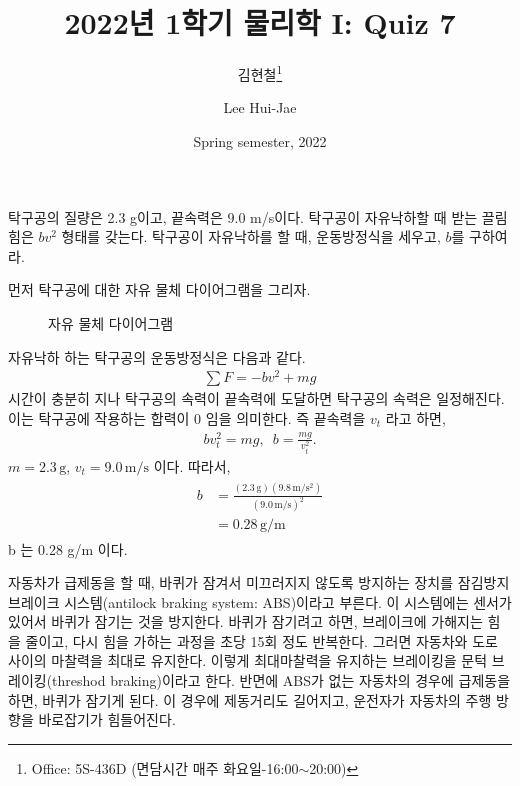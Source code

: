 \documentclass[floatfix,nofootinbib,superscriptaddress,fleqn]{revtex4-2}
\begin{document}
\title{\Large 2022년 1학기 물리학 I: Quiz 7}
\author{김현철\footnote{Office: 5S-436D (면담시간 매주
    화요일-16:00$\sim$20:00)}} 
\author{Lee Hui-Jae} 
\date{Spring semester, 2022}


\vspace{1.cm}
\maketitle

탁구공의 질량은 2.3 g이고, 끝속력은 $9.0$ m/s이다. 탁구공이 자유낙하할
때 받는 끌림힘은 $bv^2$ 형태를 갖는다. 탁구공이 자유낙하를 할 때,
운동방정식을 세우고, $b$를 구하여라.  

 먼저 탁구공에 대한 자유 물체 다이어그램을 그리자.
\begin{figure}[htp]
  \centering
  \caption{자유 물체 다이어그램}
  \label{fig:1}
\end{figure}

자유낙하 하는 탁구공의 운동방정식은 다음과 같다.
\begin{align}
  \sum F = -bv^2+mg
\end{align}
시간이 충분히 지나 탁구공의 속력이 끝속력에 도달하면 탁구공의 속력은 
일정해진다. 이는 탁구공에 작용하는 합력이 0 임을 의미한다. 즉 끝속력을
$v_t$ 라고 하면,
\begin{align}
  bv_t^2 = mg,\,\,\, b =\frac{mg}{v_t^2}.
\end{align}
$m = 2.3\,\mathrm{g}$, $v_t = 9.0\,\mathrm{m/s}$ 이다. 따라서,
\begin{align}
  \begin{split}
    b &= \frac{(2.3\,\mathrm{g})(9.8\,\mathrm{m/s^2})}{( 9.0\,\mathrm{m/s})^2}  \\
    &= 0.28\,\mathrm{g/m}
  \end{split}
  \end{align}
  b 는 0.28 g/m 이다.
\vspace{1.cm}

 자동차가 급제동을 할 때, 바퀴가
잠겨서 미끄러지지 않도록 방지하는 장치를 잠김방지 브레이크
시스템(antilock braking system: ABS)이라고 부른다. 이 시스템에는
센서가 있어서 바퀴가 잠기는 것을 방지한다. 바퀴가 잠기려고 하면,
브레이크에 가해지는 힘을 줄이고, 다시 힘을 가하는 과정을 초당 15회
정도 반복한다. 그러면 자동차와 도로 사이의 마찰력을 최대로
유지한다. 이렇게 최대마찰력을 유지하는 브레이킹을 문턱
브레이킹(threshod braking)이라고 한다.
반면에 ABS가 없는 자동차의 경우에 급제동을 하면, 바퀴가
잠기게 된다. 이 경우에 제동거리도 길어지고, 운전자가 자동차의 주행
방향을 바로잡기가 힘들어진다.
\end{document}

